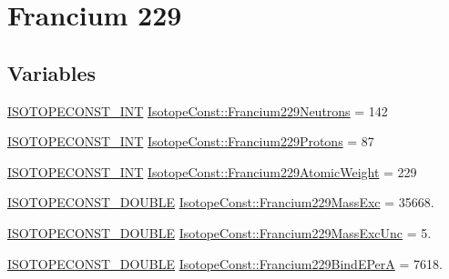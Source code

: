\hypertarget{group___isotope_const-_francium-_fr229}{}\section{Francium 229}
\label{group___isotope_const-_francium-_fr229}
\subsection*{Variables}
\begin{DoxyCompactItemize}
\item 
\mbox{\hyperlink{group___isotope_const-_macros_ga5f18360b3e99483a35c32d789e62621c}{I\+S\+O\+T\+O\+P\+E\+C\+O\+N\+S\+T\+\_\+\+I\+NT}} \mbox{\hyperlink{group___isotope_const-_francium-_fr229_ga444732277afdec0bb2c288ef975a26ff}{Isotope\+Const\+::\+Francium229\+Neutrons}} = 142
\item 
\mbox{\hyperlink{group___isotope_const-_macros_ga5f18360b3e99483a35c32d789e62621c}{I\+S\+O\+T\+O\+P\+E\+C\+O\+N\+S\+T\+\_\+\+I\+NT}} \mbox{\hyperlink{group___isotope_const-_francium-_fr229_ga36c1e72b7bb8e3e694af951df9b8eaa0}{Isotope\+Const\+::\+Francium229\+Protons}} = 87
\item 
\mbox{\hyperlink{group___isotope_const-_macros_ga5f18360b3e99483a35c32d789e62621c}{I\+S\+O\+T\+O\+P\+E\+C\+O\+N\+S\+T\+\_\+\+I\+NT}} \mbox{\hyperlink{group___isotope_const-_francium-_fr229_gaac32cd902cb7a07cd924bee2cec8d304}{Isotope\+Const\+::\+Francium229\+Atomic\+Weight}} = 229
\item 
\mbox{\hyperlink{group___isotope_const-_macros_ga8f45a7272ce02c0b4c65c44636ed719a}{I\+S\+O\+T\+O\+P\+E\+C\+O\+N\+S\+T\+\_\+\+D\+O\+U\+B\+LE}} \mbox{\hyperlink{group___isotope_const-_francium-_fr229_gaa13818e3816b44fa4657ca8be93376ed}{Isotope\+Const\+::\+Francium229\+Mass\+Exc}} = 35668.
\item 
\mbox{\hyperlink{group___isotope_const-_macros_ga8f45a7272ce02c0b4c65c44636ed719a}{I\+S\+O\+T\+O\+P\+E\+C\+O\+N\+S\+T\+\_\+\+D\+O\+U\+B\+LE}} \mbox{\hyperlink{group___isotope_const-_francium-_fr229_gafcd50fffd4fb09cceb72fc48b23278bc}{Isotope\+Const\+::\+Francium229\+Mass\+Exc\+Unc}} = 5.
\item 
\mbox{\hyperlink{group___isotope_const-_macros_ga8f45a7272ce02c0b4c65c44636ed719a}{I\+S\+O\+T\+O\+P\+E\+C\+O\+N\+S\+T\+\_\+\+D\+O\+U\+B\+LE}} \mbox{\hyperlink{group___isotope_const-_francium-_fr229_gabc95be4752045c806048b1bc4674ff9d}{Isotope\+Const\+::\+Francium229\+Bind\+E\+PerA}} = 7618.
\item 

\end{DoxyCompactItemize}
